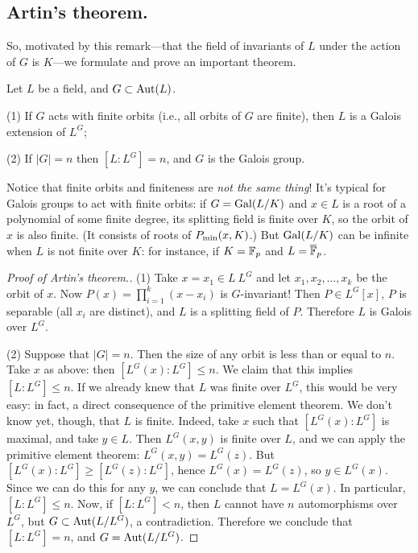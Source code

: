 \subsection{Artin's theorem.}

So, motivated by this remark---that the field of invariants of $L$ under the action of $G$ is $K$---we formulate and prove an important theorem.

\begin{thm}[Artin]
Let $L$ be a field, and $G \subset \mathrm{Aut}(L)$.

(1) If $G$ acts with finite orbits (i.e., all orbits of $G$ are finite), then $L$ is a Galois extension of $L^G$;

(2) If $|G| = n$ then $[L : L^G] = n$, and $G$ is the Galois group.
\end{thm}
\begin{rmk}
Notice that finite orbits and finiteness are \emph{not the same thing}! 
It's typical for Galois groups to act with finite orbits: if $G = \mathrm{Gal}(L/K)$ and $x \in L$ is a root of a polynomial of some finite degree, its splitting field is finite over $K$, so the orbit of $x$ is also finite.
(It consists of roots of $P_{\mathrm{min}}(x, K)$.)
But $\mathrm{Gal}(L/K)$ can be infinite when $L$ is not finite over $K$: for instance, if $K = \mathbb{F}_p$ and $L = \overline{\mathbb{F}}_p$.
\end{rmk}
\begin{proof}[Proof of Artin's theorem.]
(1) Take $x = x_1 \in L \ L^G$ and let $x_1, x_2, \dotsc, x_k$ be the orbit of $x$.
Now $P(x) = \prod_{i = 1}^{k} (x - x_i)$ is $G$-invariant!
Then $P \in L^G[x]$, $P$ is separable (all $x_i$ are distinct), and $L$ is a splitting field of $P$.
Therefore $L$ is Galois over $L^G$.

(2) Suppose that $|G| = n$. Then the size of any orbit is less than or equal to $n$.
Take $x$ as above: then $[L^G(x) : L^G] \leq n$.
We claim that this implies $[L : L^G] \leq n$.
If we already knew that $L$ was finite over $L^G$, this would be very easy: in fact, a direct consequence of the primitive element theorem.
We don't know yet, though, that $L$ is finite.
Indeed, take $x$ such that $[L^G(x): L^G]$ is maximal, and take $y \in L$.
Then $L^G(x, y)$ is finite over $L$, and we can apply the primitive element theorem: $L^G(x, y) = L^G(z)$.
But $[L^G(x): L^G] \geq [L^G(z): L^G]$, hence $L^G(x) = L^G(z)$, so $y \in L^G(x)$.
Since we can do this for any $y$, we can conclude that $L = L^G(x)$.
In particular, $[L : L^G] \leq n$.
Now, if $[L : L^G] < n$, then $L$ cannot have $n$ automorphisms over $L^G$, but $G \subset \mathrm{Aut}(L/L^G)$, a contradiction.
Therefore we conclude that $[L : L^G] = n$, and $G = \mathrm{Aut}(L/L^G)$.
\end{proof}